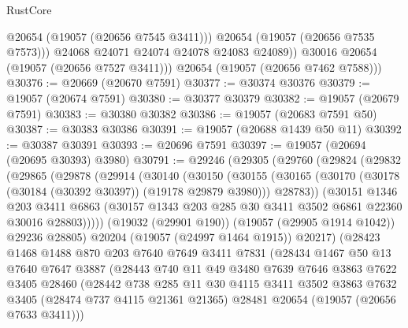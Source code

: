 \begin{lexlean}{RustCore}
\begin{coremodule}
                @20654
                (@19057 (@20656 @7545 @3411)))
              @20654
              (@19057 (@20656 @7535 @7573)))
            @24068
            @24071
            @24074
            @24078
            @24083
            @24089))
        @30016
        @20654
        (@19057 (@20656 @7527 @3411)))
      @20654
      (@19057 (@20656 @7462 @7588)))
@30376 := @20669 (@20670 @7591)
@30377 := @30374 @30376
@30379 := @19057 (@20674 @7591)
@30380 := @30377 @30379
@30382 := @19057 (@20679 @7591)
@30383 := @30380 @30382
@30386 := @19057 (@20683 @7591 @50)
@30387 := @30383 @30386
@30391 := @19057 (@20688 @1439 @50 @11)
@30392 := @30387 @30391
@30393 := @20696 @7591
@30397 := @19057 (@20694 (@20695 @30393) @3980)
@30791 := @29246
    (@29305
      (@29760
        (@29824
          (@29832
            (@29865
              (@29878
                (@29914
                  (@30140
                    (@30150
                      (@30155
                        (@30165
                          (@30170 (@30178 (@30184 (@30392 @30397)) (@19178 @29879 @3980)))
                          @28783))
                      (@30151
                        @1346
                        @203
                        @3411
                        @6863
                        (@30157 @1343 @203 @285 @30 @3411 @3502 @6861 @22360 @30016 @28803)))))
                (@19032 (@29901 @190))
                (@19057 (@29905 @1914 @1042))
                @29236
                @28805)
              @20204
              (@19057 (@24997 @1464 @1915))
              @20217)
            (@28423
              @1468
              @1488
              @870
              @203
              @7640
              @7649
              @3411
              @7831
              (@28434
                @1467
                @50
                @13
                @7640
                @7647
                @3887
                (@28443
                  @740
                  @11
                  @49
                  @3480
                  @7639
                  @7646
                  @3863
                  @7622
                  @3405
                  @28460
                  (@28442
                    @738
                    @285
                    @11
                    @30
                    @4115
                    @3411
                    @3502
                    @3863
                    @7632
                    @3405
                    (@28474 @737 @4115 @21361 @21365)
                    @28481
                    @20654
                    (@19057 (@20656 @7633 @3411)))

\end{coremodule}
\end{lexlean}
